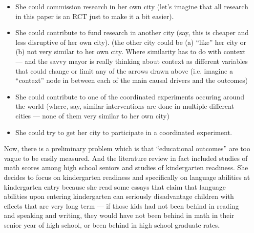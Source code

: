 \documentclass[
]{article}
\providecommand{\tightlist}{%
  \setlength{\itemsep}{0pt}\setlength{\parskip}{0pt}}
\begin{document}
\begin{itemize}
\tightlist
\item
  She could commission research in her own city (let's imagine that all
  research in this paper is an RCT just to make it a bit easier).
\item
  She could contribute to fund research in another city (say, this is
  cheaper and less disruptive of her own city). (the other city could be
  (a) ``like'' her city or (b) not very similar to her own city. Where
  similarity has to do with context --- and the savvy mayor is really
  thinking about context as different variables that could change or
  limit any of the arrows drawn above (i.e. imagine a ``context'' node
  in between each of the main causal drivers and the outcomes)
\item
  She could contribute to one of the coordinated experiments occuring
  around the world (where, say, similar interventions are done in
  multiple different cities --- none of them very similar to her own
  city)
\item
  She could try to get her city to participate in a coordinated
  experiment.
\end{itemize}

Now, there is a preliminary problem which is that ``educational
outcomes'' are too vague to be easily measured. And the literature
review in fact included studies of math scores among high school seniors
and studies of kindergarten readiness. She decides to focus on
kindergarten readiness and specifically on language abilities at
kindergarten entry because she read some essays that claim that language
abilities upon entering kindergarten can seriously disadvantage children
with effects that are very long term --- if those kids had not been
behind in reading and speaking and writing, they would have not been
behind in math in their senior year of high school, or been behind in
high school graduate rates.

\printbibliography
\end{document}
